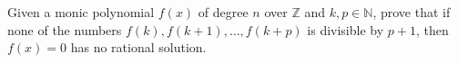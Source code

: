 Given a monic polynomial $f(x)$ of degree $n$ over $\mathbb{Z}$ and $k, p \in \mathbb{N}$, prove that if none of the numbers $f(k), f(k + 1), \ldots, f(k + p)$ is divisible by $p + 1$, then $f(x) = 0$ has no rational solution.
